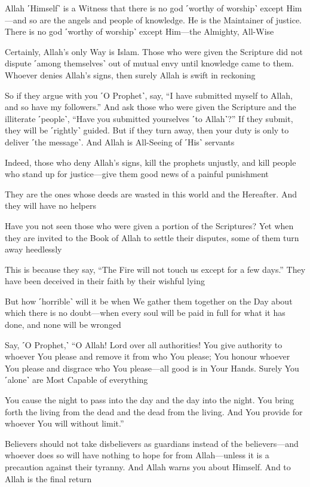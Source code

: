 Allah ˹Himself˺ is a Witness that there is no god ˹worthy of worship˺ except Him—and so are the angels and people of knowledge. He is the Maintainer of justice. There is no god ˹worthy of worship˺ except Him—the Almighty, All-Wise

Certainly, Allah’s only Way is Islam. Those who were given the Scripture did not dispute ˹among themselves˺ out of mutual envy until knowledge came to them. Whoever denies Allah’s signs, then surely Allah is swift in reckoning

So if they argue with you ˹O Prophet˺, say, “I have submitted myself to Allah, and so have my followers.” And ask those who were given the Scripture and the illiterate ˹people˺, “Have you submitted yourselves ˹to Allah˺?” If they submit, they will be ˹rightly˺ guided. But if they turn away, then your duty is only to deliver ˹the message˺. And Allah is All-Seeing of ˹His˺ servants

Indeed, those who deny Allah’s signs, kill the prophets unjustly, and kill people who stand up for justice—give them good news of a painful punishment

They are the ones whose deeds are wasted in this world and the Hereafter. And they will have no helpers

Have you not seen those who were given a portion of the Scriptures? Yet when they are invited to the Book of Allah to settle their disputes, some of them turn away heedlessly

This is because they say, “The Fire will not touch us except for a few days.” They have been deceived in their faith by their wishful lying

But how ˹horrible˺ will it be when We gather them together on the Day about which there is no doubt—when every soul will be paid in full for what it has done, and none will be wronged

Say, ˹O Prophet,˺ “O Allah! Lord over all authorities! You give authority to whoever You please and remove it from who You please; You honour whoever You please and disgrace who You please—all good is in Your Hands. Surely You ˹alone˺ are Most Capable of everything

You cause the night to pass into the day and the day into the night. You bring forth the living from the dead and the dead from the living. And You provide for whoever You will without limit.”

Believers should not take disbelievers as guardians instead of the believers—and whoever does so will have nothing to hope for from Allah—unless it is a precaution against their tyranny. And Allah warns you about Himself. And to Allah is the final return

